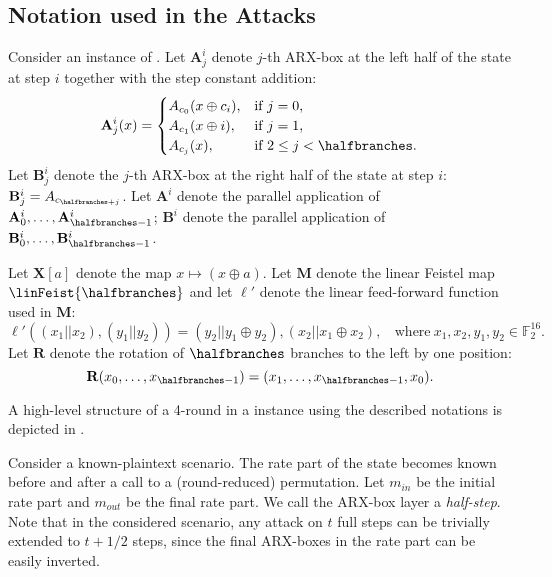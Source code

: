 \subsection*{Notation used in the Attacks}

\renewcommand\A[2]{\mathbf{A}_{#2}^{#1}}
\newcommand\B[2]{\mathbf{B}_{#2}^{#1}}
\newcommand\AINV[2]{(\A{#1}{#2})^{-1}}
\newcommand\BINV[2]{(\B{#1}{#2})^{-1}}
\newcommand\AAA[1]{\mathbf{A}^{#1}}
\newcommand\BBB[1]{\mathbf{B}^{#1}}
\newcommand\AAAINV[1]{(\AAA{#1})^{-1}}
\newcommand\BBBINV[1]{(\BBB{#1})^{-1}}

\newcommand\R{\mathbf{R}}
\newcommand\RINV{\mathbf{R}^{-1}}
\newcommand\M{\mathbf{M}}
\newcommand\El{\ell'}
\newcommand\MINV{\mathbf{M}^{-1}}
\newcommand\Min{m_{in}}
\newcommand\Mout{m_{out}}
\newcommand\xMin{\hat{m}_{in}}
\newcommand\xMout{\hat{m}_{out}}
\newcommand\XOR[1]{\mathbf{X}\left[#1\right]}

Consider an instance of \aead{}. Let $\A{i}{j}$ denote $j$-th ARX-box at the left half of the state at step $i$ together with the step constant addition:
$$
\A{i}{j}(x) = 
\begin{cases}
A_{c_0}(x \oplus c_i), & \text{if}~ j = 0, \\
A_{c_1}(x \oplus i), & \text{if}~ j = 1, \\
A_{c_j}(x), & \text{if}~ 2 \le j < \halfbranches.
\end{cases}
$$
Let $\B{i}{j}$ denote the $j$-th ARX-box at the right half of the state at step $i$: $\B{i}{j} = A_{c_{\halfbranches+j}}$.
Let $\AAA{i}$ denote the parallel application of $\A{i}{0},\ldots,\A{i}{\halfbranches-1}$; $\BBB{i}$ denote the parallel application of $\B{i}{0},\ldots,\B{i}{\halfbranches-1}$.

Let $\XOR{a}$ denote the map $x \mapsto (x \oplus a)$. Let $\M$ denote the linear Feistel map $\linFeist{\halfbranches}$ and let $\El$ denote the linear feed-forward function used in $\M$:
$$
\El((x_1 || x_2), (y_1 || y_2)) = (y_2 || y_1 \oplus y_2), (x_2 || x_1 \oplus x_2), ~~~~\text{where}~ x_1,x_2,y_1,y_2 \in \mathbb{F}_2^{16}.
$$
Let $\R$ denote the rotation of $\halfbranches$ branches to the left by one position:
$$
\R(x_0, \ldots, x_{\halfbranches-1}) = (x_1, \ldots, x_{\halfbranches-1}, x_0).
$$

A high-level structure of a 4-round \aCipher{} in a \aead{} instance using the described notations is depicted in .

Consider a known-plaintext scenario. The rate part of the state becomes known before and after a call to a (round-reduced) \aCipher{} permutation. Let $\Min$ be the initial rate part and $\Mout$ be the final rate part. We call the ARX-box layer a \emph{half-step}. Note that in the considered scenario, any attack on $t$ full steps can be trivially extended to $t+1/2$ steps, since the final ARX-boxes in the rate part can be easily inverted.

